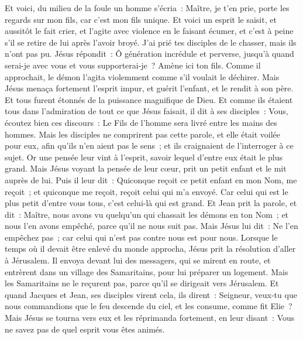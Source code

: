 \begin{multicols}{2}
Et voici, du milieu de la foule un homme s'écria~: Maître, je t'en prie, porte les regards sur mon fils, car c'est mon fils unique.
Et voici un esprit le saisit, et aussitôt le fait crier, et l'agite avec violence en le faisant écumer, et c'est à peine s'il se retire de lui après l'avoir broyé.
J'ai prié tes disciples de le chasser, mais ils n'ont pas pu.
Jésus répondit~: Ô génération incrédule et perverse, jusqu'à quand serai-je avec vous et vous supporterai-je~? Amène ici ton fils.
Comme il approchait, le démon l'agita violemment comme s'il voulait le déchirer. Mais Jésus menaça fortement l'esprit impur, et guérit l'enfant, et le rendit à son père.
Et tous furent étonnés de la puissance magnifique de Dieu. Et comme ils étaient tous dans l'admiration de tout ce que Jésus faisait, il dit à ses disciples~:
Vous, écoutez bien ces discours~: Le Fils de l'homme sera livré entre les mains des hommes.
Mais les disciples ne comprirent pas cette parole, et elle était voilée pour eux, afin qu'ils n'en aient pas le sens~; et ils craignaient de l'interroger à ce sujet.
Or une pensée leur vint à l'esprit, savoir lequel d'entre eux était le plus grand.
Mais Jésus voyant la pensée de leur cœur, prit un petit enfant et le mit auprès de lui.
Puis il leur dit~: Quiconque reçoit ce petit enfant en mon Nom, me reçoit~; et quiconque me reçoit, reçoit celui qui m'a envoyé. Car celui qui est le plus petit d'entre vous tous, c'est celui-là qui est grand.
Et Jean prit la parole, et dit~: Maître, nous avons vu quelqu'un qui chassait les démons en ton Nom~; et nous l'en avons empêché, parce qu'il ne nous suit pas.
Mais Jésus lui dit~: Ne l'en empêchez pas~; car celui qui n'est pas contre nous est pour nous.
Lorsque le temps où il devait être enlevé du monde approcha, Jésus prit la résolution d'aller à Jérusalem.
Il envoya devant lui des messagers, qui se mirent en route, et entrèrent dans un village des Samaritains, pour lui préparer un logement.
Mais les Samaritains ne le reçurent pas, parce qu'il se dirigeait vers Jérusalem.
Et quand Jacques et Jean, ses disciples virent cela, ils dirent~: Seigneur, veux-tu que nous commandions que le feu descende du ciel, et les consume, comme fit Elie~?
Mais Jésus se tourna vers eux et les réprimanda fortement, en leur disant~: Vous ne savez pas de quel esprit vous êtes animés.

\end{multicols}

